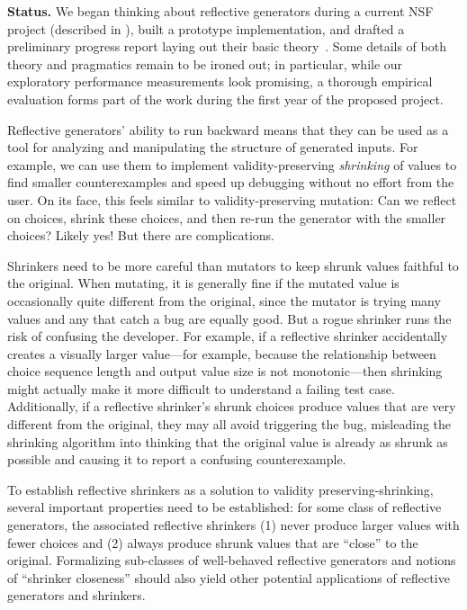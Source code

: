 \smallskip

{\bf Status.} We began thinking about reflective generators during a
current NSF project (described in ), built a
prototype implementation, and drafted a preliminary progress report
laying out their basic theory~\cite{Frohlich2022}. Some details of
both theory and pragmatics remain to be ironed out; in particular,
while our exploratory performance measurements look promising, a
thorough empirical evaluation forms part of the work during the first
year of the proposed project.


%
Reflective generators' ability to run backward means that they can be used as
a tool for analyzing and manipulating the structure of
generated
inputs.  For example, we can use them to
implement validity-preserving {\em
shrinking} of values to find smaller counterexamples and speed up debugging
without no effort from the user. On its face, this feels similar to
validity-preserving mutation: Can we reflect on choices, shrink these
choices, and
then re-run the generator with the smaller choices? Likely yes! But there are
complications.

Shrinkers need to be more careful than mutators to keep shrunk values faithful
to the original. When mutating, it is generally fine if the mutated value is
occasionally quite different from the original, since the mutator is
trying many values and any that catch a bug are equally good. But a rogue
shrinker runs the risk of confusing the developer. For example, if a
reflective shrinker accidentally creates a visually larger
value---for example, because the relationship between choice sequence length and
output value size is not monotonic---then shrinking might actually make it more
difficult to understand a failing test case. Additionally, if a
reflective shrinker's shrunk choices
produce values that are very different from the original, they may all
avoid triggering the bug, misleading the shrinking algorithm into thinking that
the original value is already as shrunk as possible and causing it to
report a confusing counterexample.

To establish reflective shrinkers as a solution to
validity preserving-shrinking, several important
properties need to be established: for some class of reflective
generators, the associated reflective shrinkers (1) never produce larger values
with fewer choices and (2) always produce shrunk values that are ``close'' to
the original. Formalizing sub-classes of well-behaved reflective generators and
notions of ``shrinker closeness'' should also yield
other potential applications of reflective generators and shrinkers.

